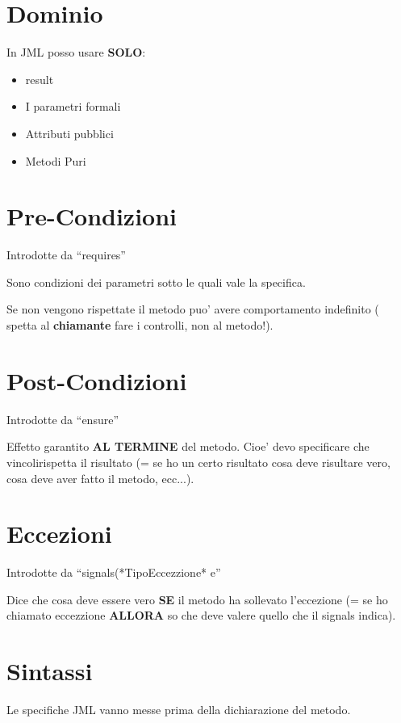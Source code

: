 \documentclass[\main/main.tex]{subfiles}
\begin{document}
\section{Dominio}
In JML posso usare \textbf{SOLO}:
\begin{itemize}
  \item  \bs result
  \item I parametri formali
  \item Attributi pubblici
  \item Metodi Puri
\end{itemize}






\section{Pre-Condizioni}
Introdotte da ``requires''

Sono condizioni dei parametri sotto le quali vale la specifica.

Se non vengono rispettate il metodo puo' avere comportamento indefinito ( spetta al \textbf{chiamante} fare i controlli, non al metodo!).





\section{Post-Condizioni}
Introdotte da ``ensure''

Effetto garantito \textbf{AL TERMINE} del metodo.
Cioe' devo specificare che vincolirispetta il risultato (= se ho un certo risultato cosa deve risultare vero, cosa deve aver fatto il metodo, ecc...).







\section{Eccezioni}
Introdotte da ``signals(*TipoEccezzione* e''

Dice che cosa deve essere vero \textbf{SE} il metodo ha sollevato l'eccezione (= se ho chiamato eccezzione \textbf{ALLORA} so che deve valere quello che il signals indica).





\section{Sintassi}
Le specifiche JML vanno messe prima della dichiarazione del metodo.
\end{document}
